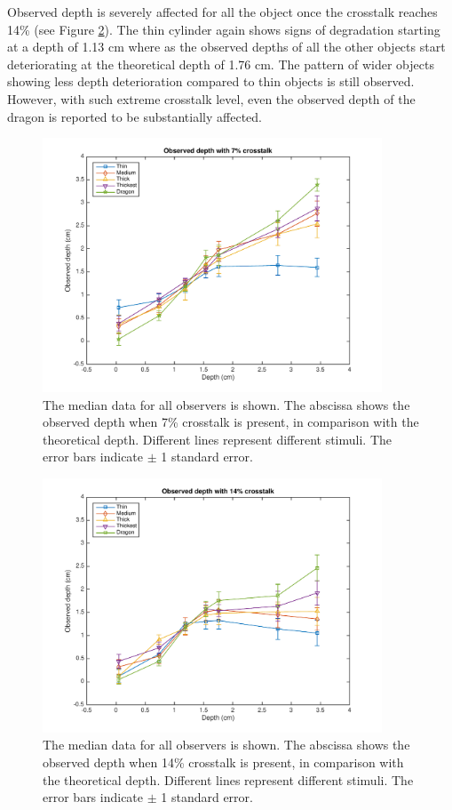 Observed depth is severely affected for all the object once the crosstalk reaches 14\% (see Figure \ref{fig:s_crosstalk_14}). The thin cylinder again shows signs of degradation starting at a depth of 1.13 cm where as the observed depths of all the other objects start deteriorating at the theoretical depth of 1.76 cm. The pattern of wider objects showing less depth deterioration compared to thin objects is still observed. However, with such extreme crosstalk level, even the observed depth of the dragon is reported to be substantially affected.

\begin{figure}[H]
\centering
    \includegraphics[width=0.9\textwidth]{./Template_Figures/s_crosstalk_7}
    \caption{The median data for all observers is shown. The abscissa shows the observed depth when 7\% crosstalk is present, in comparison with the theoretical depth. Different lines represent different stimuli. The error bars indicate $\pm$ 1 standard error.\label{fig:s_crosstalk_7}}
\end{figure}

\begin{figure}[H]
\centering
    \includegraphics[width=0.9\textwidth]{./Template_Figures/s_crosstalk_14}
\caption{The median data for all observers is shown. The abscissa shows the observed depth when 14\% crosstalk is present, in comparison with the theoretical depth. Different lines represent different stimuli. The error bars indicate $\pm$ 1 standard error.\label{fig:s_crosstalk_14}}
\end{figure}



